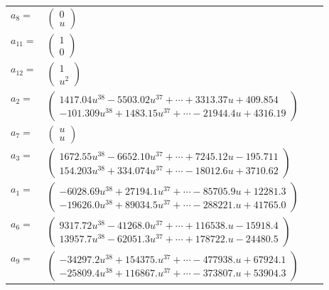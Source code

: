 \documentclass[1p]{elsarticle_modified}
\theoremstyle{definition}
\begin{document}
\begin{tabular}{m{7pt} m{180pt} m{7pt} m{180pt} }
\flushright $a_{8}=$&$\begin{pmatrix}0\\u\end{pmatrix}$ \\
\flushright $a_{11}=$&$\begin{pmatrix}1\\0\end{pmatrix}$ \\
\flushright $a_{12}=$&$\begin{pmatrix}1\\u^2\end{pmatrix}$ \\
\flushright $a_{2}=$&$\begin{pmatrix}1417.04 u^{38}-5503.02 u^{37}+\cdots+3313.37 u+409.854\\-101.309 u^{38}+1483.15 u^{37}+\cdots-21944.4 u+4316.19\end{pmatrix}$ \\
\flushright $a_{7}=$&$\begin{pmatrix}u\\u\end{pmatrix}$ \\
\flushright $a_{3}=$&$\begin{pmatrix}1672.55 u^{38}-6652.10 u^{37}+\cdots+7245.12 u-195.711\\154.203 u^{38}+334.074 u^{37}+\cdots-18012.6 u+3710.62\end{pmatrix}$ \\
\flushright $a_{1}=$&$\begin{pmatrix}-6028.69 u^{38}+27194.1 u^{37}+\cdots-85705.9 u+12281.3\\-19626.0 u^{38}+89034.5 u^{37}+\cdots-288221. u+41765.0\end{pmatrix}$ \\
\flushright $a_{6}=$&$\begin{pmatrix}9317.72 u^{38}-41268.0 u^{37}+\cdots+116538. u-15918.4\\13957.7 u^{38}-62051.3 u^{37}+\cdots+178722. u-24480.5\end{pmatrix}$ \\
\flushright $a_{9}=$&$\begin{pmatrix}-34297.2 u^{38}+154375. u^{37}+\cdots-477938. u+67924.1\\-25809.4 u^{38}+116867. u^{37}+\cdots-373807. u+53904.3\end{pmatrix}$ \\

\end{tabular}
\end{document}
